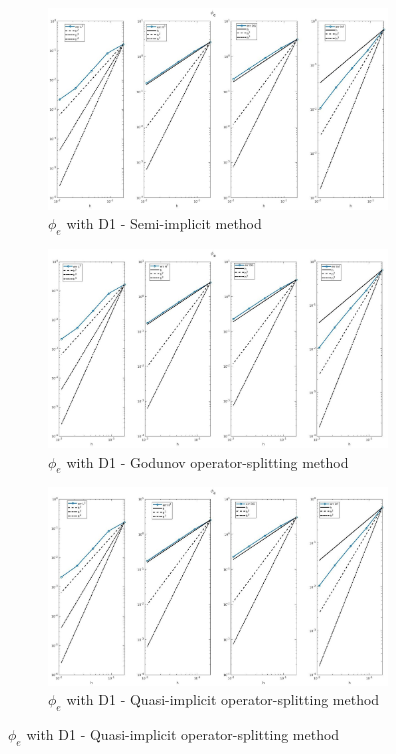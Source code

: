 \documentclass[a4paper,11pt]{article}
\begin{document}
\begin{figure} \captionsetup{size = large} \caption{Comparison of $\phi_e$ and $w$ errors between different time-discretization schemes} \label{pe-time}
\begin{subfigure}{0.5\textwidth}
\includegraphics[width = 9cm]{./D1_Phie_1.jpg}
\caption*{$\phi_e$ with D1 - Semi-implicit method}
\end{subfigure}
\begin{subfigure}{0.5\textwidth}
\includegraphics[width =9cm]{./D1_Phie_1_GO.jpg}
\caption*{$\phi_e$ with D1 - Godunov operator-splitting method}
\end{subfigure}
\begin{center}
\begin{subfigure}{0.5\textwidth}
\includegraphics[width =9cm]{./D1_Phie_1_OS.jpg}
\caption*{$\phi_e$ with D1 - Quasi-implicit operator-splitting method}
\end{subfigure}
\end{center}

\end{figure}
\end{document}
